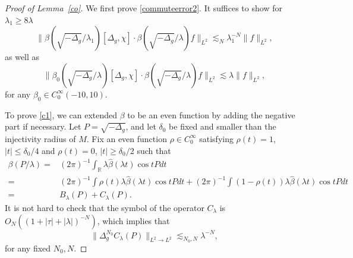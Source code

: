 \documentclass[10pt,a4paper]{amsart}
\newcommand{\R}{{\mathbb R}}
\newcommand{\la}{\lambda}
\begin{document}
\begin{proof}[Proof of Lemma~\ref{co}]


We first prove \eqref{commuteerror2}. It suffices to show for $\la_1\ge 8\la$
\begin{equation}\label{c1}
\| \beta(\sqrt{-\Delta_g}/\la_1)[\Delta_g,\chi] \cdot \beta(\sqrt{-\Delta_g}/\la)f\|_{L^2}\lesssim_N \la_1^{-N}\|f\|_{L^2}, 
\end{equation}
as well as 
\begin{equation}\label{c2}
\| \beta_0(\sqrt{-\Delta_g}/\la)[\Delta_g,\chi] \cdot \beta(\sqrt{-\Delta_g}/\la)f\|_{L^2}\lesssim \la\|f\|_{L^2},
\end{equation}
for any $\beta_0\in C_0^\infty(-10,10)$. 

To prove \eqref{c1}, 
 we can extended $\beta$ to be an even function by adding the negative part if necessary. Let $P=\sqrt{-\Delta_g}$, and let $\delta_0$ be fixed and smaller than the injectivity radius of $M$. 
Fix an even function $\rho\in C_0^\infty$   satisfying $\rho(t)= 1$, $|t|\le \delta_0/4$ and $\rho(t)=0 $, $|t|\ge \delta_0/2$ such that
\begin{equation}\label{c3}
\begin{aligned}
     \beta( P/\la)=&(2\pi)^{-1}\int_\R\la\hat \beta(\la t)\cos t P dt \\
     =&(2\pi)^{-1}\int\rho(t)\la\hat \beta(\la t)\cos t P dt+ (2\pi)^{-1}\int (1-\rho(t)) \la\hat \beta(\la t)\cos t P dt\\
     =& B_\la(P)+C_\la(P).
\end{aligned}
\end{equation}
It is not hard to check that the symbol of the operator $C_\la$ is $O_N((1+|\tau|+|\la|)^{-N})$, which implies that 
  \begin{equation}\label{cestimatee}
      \|\Delta_g^{N_0} C_\la(P)\|_{L^2\to L^2}\lesssim_{N_0,N}\la^{-N},
  \end{equation}
 for any fixed $N_0, N$.


  
  

\end{proof}
\end{document}

